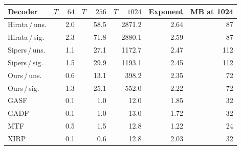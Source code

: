 \begin{tabular}{@{}lrrrrr@{}}
\toprule
Decoder & $T=64$ & $T=256$ & $T=1024$ & Exponent & MB at 1024 \\
\midrule
Hirata\,/\,uns. & 2.0 & 58.5 & 2871.2 & 2.64 & 87 \\
Hirata\,/\,sig. & 2.3 & 71.8 & 2880.1 & 2.59 & 87 \\
Sipers\,/\,uns. & 1.1 & 27.1 & 1172.7 & 2.47 & 112 \\
Sipers\,/\,sig. & 1.5 & 29.9 & 1193.1 & 2.45 & 112 \\
Ours\,/\,uns. & 0.6 & 13.1 & 398.2 & 2.35 & 72 \\
Ours\,/\,sig. & 1.3 & 25.1 & 552.0 & 2.22 & 72 \\
GASF & 0.1 & 1.0 & 12.0 & 1.85 & 32 \\
GADF & 0.1 & 1.0 & 13.0 & 1.72 & 32 \\
MTF & 0.5 & 1.5 & 12.8 & 1.22 & 24 \\
XIRP & 0.1 & 0.6 & 12.8 & 2.03 & 32 \\
\bottomrule
\end{tabular}

